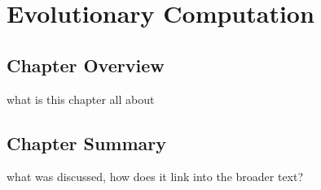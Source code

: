 %
%


%
%
\chapter{Evolutionary Computation}
\label{ch:ec}

%
%
\section{Chapter Overview}
\label{sec:ec:overview}
what is this chapter all about

%
%
\newpage
\newpage


%
%
\section{Chapter Summary}
\label{sec:ec:summary}
what was discussed, how does it link into the broader text?



